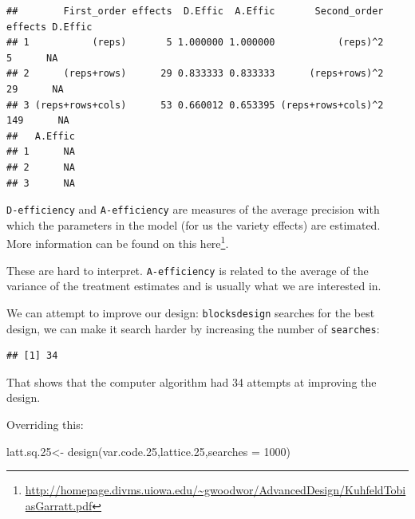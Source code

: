 \documentclass[
]{book}
\newenvironment{Shaded}{\begin{snugshade}}{\end{snugshade}}
\newcommand{\AttributeTok}[1]{\textcolor[rgb]{0.77,0.63,0.00}{#1}}
\newcommand{\CommentTok}[1]{\textcolor[rgb]{0.56,0.35,0.01}{\textit{#1}}}
\newcommand{\DecValTok}[1]{\textcolor[rgb]{0.00,0.00,0.81}{#1}}
\newcommand{\FloatTok}[1]{\textcolor[rgb]{0.00,0.00,0.81}{#1}}
\newcommand{\FunctionTok}[1]{\textcolor[rgb]{0.00,0.00,0.00}{#1}}
\newcommand{\NormalTok}[1]{#1}
\newcommand{\OtherTok}[1]{\textcolor[rgb]{0.56,0.35,0.01}{#1}}
\newcommand{\SpecialCharTok}[1]{\textcolor[rgb]{0.00,0.00,0.00}{#1}}
\renewcommand{\href}[2]{#2\footnote{\url{#1}}}
\begin{document}
\begin{Shaded}
\end{Shaded}

\begin{verbatim}
##        First_order effects  D.Effic  A.Effic       Second_order effects D.Effic
## 1           (reps)       5 1.000000 1.000000           (reps)^2       5      NA
## 2      (reps+rows)      29 0.833333 0.833333      (reps+rows)^2      29      NA
## 3 (reps+rows+cols)      53 0.660012 0.653395 (reps+rows+cols)^2     149      NA
##   A.Effic
## 1      NA
## 2      NA
## 3      NA
\end{verbatim}

\texttt{D-efficiency} and \texttt{A-efficiency} are measures of the average precision with which the parameters in the model (for us the variety effects) are estimated. More information can be found on this \href{http://homepage.divms.uiowa.edu/~gwoodwor/AdvancedDesign/KuhfeldTobiasGarratt.pdf}{here}.

These are hard to interpret. \texttt{A-efficiency} is related to the average of the variance of the treatment estimates and is usually what we are interested in.

We can attempt to improve our design: \texttt{blocksdesign} searches for the best design, we can make it search harder by increasing the number of \texttt{searches}:

\begin{Shaded}
\end{Shaded}

\begin{verbatim}
## [1] 34
\end{verbatim}

That shows that the computer algorithm had 34 attempts at improving the design.

Overriding this:

\begin{Shaded}
\begin{Highlighting}[]
\NormalTok{latt.sq}\FloatTok{.25}\OtherTok{\textless{}{-}} \FunctionTok{design}\NormalTok{(var.code}\FloatTok{.25}\NormalTok{,lattice}\FloatTok{.25}\NormalTok{,}\AttributeTok{searches =} \DecValTok{1000}\NormalTok{)}
\end{Highlighting}
\end{Shaded}
\end{document}
